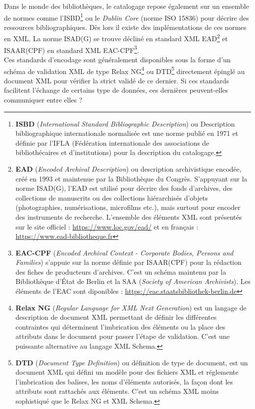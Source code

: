 Dans le monde des bibliothèques, le catalogage repose également sur un ensemble de normes comme l'ISBD\footnote{\textbf{ISBD} (\textit{International Standard Bibliographic Description}) ou Description bibliographique internationale normalisée est une norme publié en 1971 et définie par l'IFLA (Fédération internationale des associations de bibliothécaires et d'institutions) pour la description du catalogage.} ou le \textit{Dublin Core} (norme ISO 15836) pour décrire des ressources bibliographiques.
\newpage
Dès lors il existe des implémentations de ces normes en XML. La norme ISAD(G) se trouve décliné en standard XML EAD\footnote{\textbf{EAD} (\textit{Encoded Archival Description}) ou description archivistique encodée, créé en 1993 et maintenue par la Bibliothèque du Congrès. S'appuyant sur la norme ISAD(G), l'EAD est utilisé pour décrire des fonds d'archives, des collections de manuscrits ou des collections hiérarchisés d'objets (photographies, numérisations, microfilms etc.), mais surtout pour encoder des instruments de recherche. L'ensemble des éléments XML sont présentés sur le site officiel : \url{https://www.loc.gov/ead/} et en français : \url{https://www.ead-bibliotheque.fr}} et ISAAR(CPF) en standard XML EAC-CPF\footnote{\textbf{EAC-CPF} (\textit{Encoded Archival Context - Corporate Bodies, Persons and Families}) s'appuie sur la norme définie par ISAAR(CPF) pour la rédaction des fiches de producteurs d'archives. C'est un schéma maintenu par la Bibliothèque d'État de Berlin et la SAA (\textit{Society of American Archivists}). Les éléments de l'EAC sont diponibles : \url{https://eac.staatsbibliothek-berlin.de}}.\\

Ces standards d'encodage sont généralement disponibles sous la forme d'un schéma de validation XML de type Relax NG\footnote{\textbf{Relax NG} (\textit{Regular Language for XML Next Generation}) est un langage de description de document XML permettant de définir les différentes contraintes qui déterminent l'imbrication des éléments ou la place des attributs dans le document pour passer l'étape de validation. C'est une puissante alternative au langage XML Schema.} ou DTD\footnote{\textbf{DTD} (\textit{Document Type Definition}) ou définition de type de document, est un document XML qui défini un modèle pour des fichiers XML et réglemente l'imbrication des balises, les noms d'éléments autorisés, la façon dont les attributs sont rattachés aux éléments. C'est un schéma XML moins sophistiqué que le Relax NG et XML Schema.} directement épinglé au document XML pour vérifier la strict validé de ce dernier. 
Si ces standards facilitent l'échange de certains type de données, ces dernières peuvent-elles communiquer entre elles ?\\

